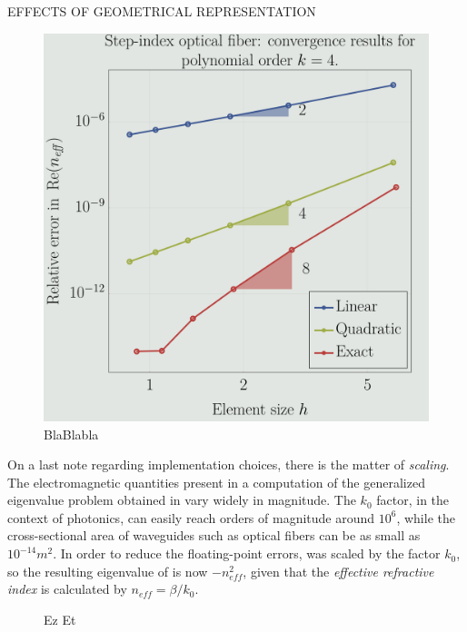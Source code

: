 \documentclass[final]{beamer} %
\begin{document}
\begin{frame}
\begin{columns}
\begin{column}{0.45\textwidth}
{\begin{block}{\boxnumber EFFECTS OF GEOMETRICAL REPRESENTATION}
\begin{figure}[ht]
            \includegraphics[width=0.8\linewidth]{images/convergenceRates_k4_poster.png}
            \caption{BlaBlabla}
            \label{fig:test}
        \end{figure}
        
        On a last note regarding implementation choices, there is the matter of \emph{scaling}. The electromagnetic quantities present in a computation of the generalized eigenvalue problem obtained in  vary widely in magnitude. The $k_0$ factor, in the context of photonics, can easily reach orders of magnitude around $10^6$, while the cross-sectional area of waveguides such as optical fibers can be as small as $10^{-14}m^2$. In order to reduce the floating-point errors,  was scaled by the factor $k_0$, so the resulting eigenvalue of  is now $-n_{eff}^2$, given that the \emph{effective refractive index} is calculated by $n_{eff} = \beta/k_0$.
        \begin{figure}[hb]
        	\begin{mdframed}[backgroundcolor=bggrey]
        		Ez \hfill Et
        		

\end{mdframed}
\end{figure}
\end{block}}
\end{column}
\end{columns}
\end{frame}
\end{document}
